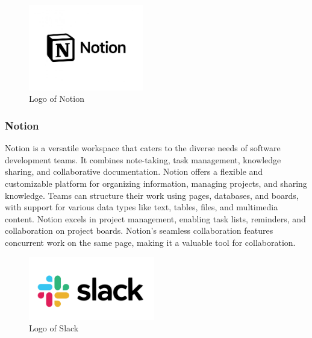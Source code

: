 \documentclass[conference]{IEEEtran}
\begin{document}
        \begin{figure}[htbp]
        \centerline{\includegraphics[width=5cm]{Images/logo/notion.png}}
        \label{fig}
        \caption{Logo of Notion}
        \end{figure}
        \subsubsection{Notion}
        Notion is a versatile workspace that caters to the diverse needs of software development teams. It combines note-taking, task management, knowledge sharing, and collaborative documentation. Notion offers a flexible and customizable platform for organizing information, managing projects, and sharing knowledge. Teams can structure their work using pages, databases, and boards, with support for various data types like text, tables, files, and multimedia content. Notion excels in project management, enabling task lists, reminders, and collaboration on project boards. Notion's seamless collaboration features concurrent work on the same page, making it a valuable tool for collaboration.\\

        \begin{figure}[htbp]
        \centerline{\includegraphics[width=5.5cm]{Images/logo/slack.png}}
        \label{fig}
        \caption{Logo of Slack}
        \end{figure}
\end{document}
